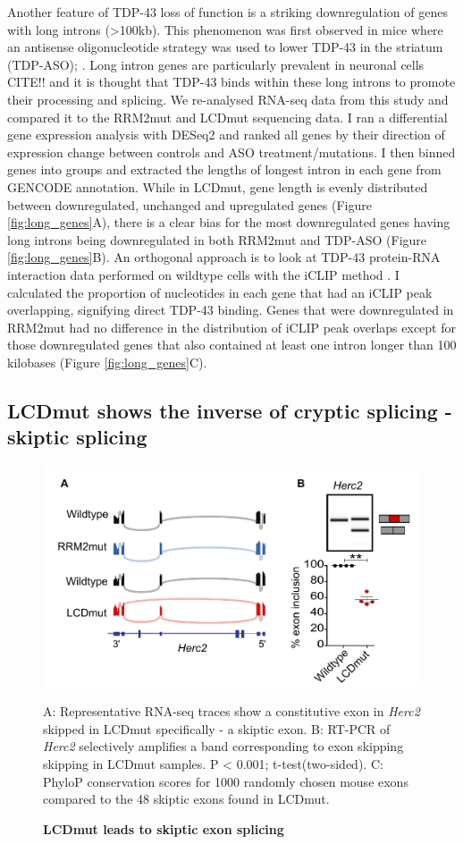 Another feature of TDP-43 loss of function is a striking downregulation of genes with long introns (>100kb). This phenomenon was first observed in mice where an antisense oligonucleotide strategy was used to lower TDP-43 in the striatum (TDP-ASO); \citep{Polymenidou2011-hs}. Long intron genes are particularly prevalent in neuronal cells CITE!! and it is thought that TDP-43 binds within these long introns to promote their processing and splicing. We re-analysed RNA-seq data from this study and compared it to the RRM2mut and LCDmut sequencing data. I ran a differential gene expression analysis with DESeq2 and ranked all genes by their direction of expression change between controls and ASO treatment/mutations. I then binned genes into groups and extracted the lengths of longest intron in each gene from GENCODE annotation. While in LCDmut, gene length is evenly distributed between downregulated, unchanged and upregulated genes (Figure \ref{fig:long_genes}A), there is a clear bias for the most downregulated genes having long introns being downregulated in both RRM2mut and TDP-ASO (Figure \ref{fig:long_genes}B). An orthogonal approach is to look at TDP-43 protein-RNA interaction data performed on wildtype cells with the iCLIP method \citep{Huppertz2014-ip}. I calculated the proportion of nucleotides in each gene that had an iCLIP peak overlapping, signifying direct TDP-43 binding. Genes that were downregulated in RRM2mut had no difference in the distribution of iCLIP peak overlaps except for those downregulated genes that also contained at least one intron longer than 100 kilobases (Figure \ref{fig:long_genes}C). 


\subsection{LCDmut shows the inverse of cryptic splicing - skiptic splicing}

\begin{figure}[h!]
	\centering
	\includegraphics[width=12cm]{Figures/05_tdp_mice/skiptic_exon_multi.png}
	\caption{\textbf{LCDmut leads to skiptic exon splicing}}
	A: Representative RNA-seq traces show a constitutive exon in \textit{Herc2} skipped in LCDmut specifically - a skiptic exon. B: RT-PCR of \textit{Herc2} selectively amplifies a band corresponding to exon skipping skipping in LCDmut samples. P < 0.001; t-test(two-sided). C: PhyloP conservation scores for 1000 randomly chosen mouse exons compared to the 48 skiptic exons found in LCDmut.
	\label{fig:skiptic_multi}
\end{figure}

